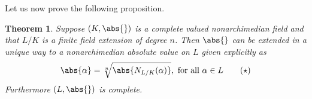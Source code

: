 \documentclass{article}
\newtheorem{theorem}{Theorem}[section]
\numberwithin{equation}{section}
\begin{document}
Let us now prove the following proposition.

\begin{theorem}\label{thm: Extension of absolute value}
    Suppose $(K, \abs{})$ is a complete valued nonarchimedian field and that $L/K$ is a finite field extension of degree $n$. Then $\abs{}$ can be extended in a unique way to a nonarchimedian absolute value on $L$ given explicitly as
    \begin{equation}\label{eq: Extended absolute value}
        \abs{\alpha} = \sqrt[n]{\abs{N_{L/K}(\alpha)}}, \text{ for all } \alpha \in L\tag{$\star$}
    \end{equation}
    Furthermore $(L, \abs{})$ is complete.
\end{theorem}
\end{document}
